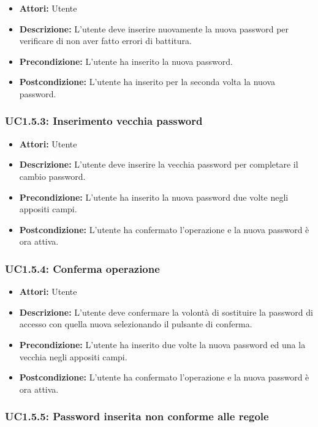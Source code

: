 \begin{itemize}
    \item \textbf{Attori:} Utente
    \item \textbf{Descrizione:} L'utente deve inserire nuovamente la nuova password per verificare di non aver fatto errori di battitura.
    \item \textbf{Precondizione:} L'utente ha inserito la nuova password.
    \item \textbf{Postcondizione:} L'utente ha inserito per la seconda volta la nuova password.
\end{itemize}

\subsubsection{UC1.5.3: Inserimento vecchia password}

\begin{itemize}
    \item \textbf{Attori:} Utente
    \item \textbf{Descrizione:} L'utente deve inserire la vecchia password per completare il cambio password.
    \item \textbf{Precondizione:} L'utente ha inserito la nuova password due volte negli appositi campi.
    \item \textbf{Postcondizione:} L'utente ha confermato l'operazione e la nuova password è ora attiva.
\end{itemize}

\subsubsection{UC1.5.4: Conferma operazione}

\begin{itemize}
    \item \textbf{Attori:} Utente
    \item \textbf{Descrizione:} L'utente deve confermare la volontà di sostituire la password di accesso con quella nuova selezionando il pulsante di conferma.
    \item \textbf{Precondizione:} L'utente ha inserito due volte la nuova password ed una la vecchia negli appositi campi.
    \item \textbf{Postcondizione:} L'utente ha confermato l'operazione e la nuova password è ora attiva.
\end{itemize}

\subsubsection{UC1.5.5: Password inserita non conforme alle regole}


